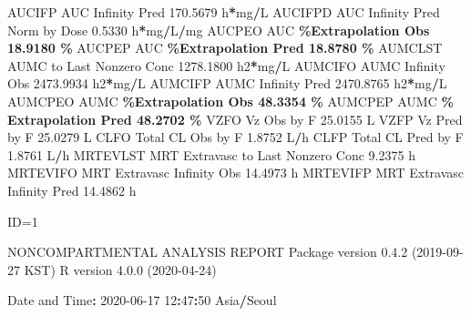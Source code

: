 \documentclass[
  12pt,
]{krantz}
\newenvironment{Shaded}{\begin{snugshade}}{\end{snugshade}}
\newcommand{\DecValTok}[1]{\textcolor[rgb]{0.00,0.00,0.81}{#1}}
\newcommand{\FloatTok}[1]{\textcolor[rgb]{0.00,0.00,0.81}{#1}}
\newcommand{\NormalTok}[1]{#1}
\newcommand{\OperatorTok}[1]{\textcolor[rgb]{0.81,0.36,0.00}{\textbf{#1}}}
\newcommand{\StringTok}[1]{\textcolor[rgb]{0.31,0.60,0.02}{#1}}
\begin{document}
\begin{Shaded}
\begin{Highlighting}[]
\NormalTok{AUCIFP     AUC Infinity Pred                             }\FloatTok{170.5679}\NormalTok{ h}\OperatorTok{*}\NormalTok{mg}\OperatorTok{/}\NormalTok{L}
\NormalTok{AUCIFPD    AUC Infinity Pred Norm by Dose                  }\FloatTok{0.5330}\NormalTok{ h}\OperatorTok{*}\NormalTok{mg}\OperatorTok{/}\NormalTok{L}\OperatorTok{/}\NormalTok{mg}
\NormalTok{AUCPEO     AUC }\OperatorTok{\%Extrapolation Obs                         18.9180 \%}
\NormalTok{AUCPEP     AUC }\OperatorTok{\%Extrapolation Pred                        18.8780 \%}
\NormalTok{AUMCLST    AUMC to Last Nonzero Conc                    }\FloatTok{1278.1800}\NormalTok{ h2}\OperatorTok{*}\NormalTok{mg}\OperatorTok{/}\NormalTok{L}
\NormalTok{AUMCIFO    AUMC Infinity Obs                            }\FloatTok{2473.9934}\NormalTok{ h2}\OperatorTok{*}\NormalTok{mg}\OperatorTok{/}\NormalTok{L}
\NormalTok{AUMCIFP    AUMC Infinity Pred                           }\FloatTok{2470.8765}\NormalTok{ h2}\OperatorTok{*}\NormalTok{mg}\OperatorTok{/}\NormalTok{L}
\NormalTok{AUMCPEO    AUMC }\OperatorTok{\%Extrapolation Obs                        48.3354 \%}
\NormalTok{AUMCPEP    AUMC }\OperatorTok{\% Extrapolation Pred                      48.2702 \%}
\NormalTok{VZFO       Vz Obs by F                                    }\FloatTok{25.0155}\NormalTok{ L}
\NormalTok{VZFP       Vz Pred by F                                   }\FloatTok{25.0279}\NormalTok{ L}
\NormalTok{CLFO       Total CL Obs by F                               }\FloatTok{1.8752}\NormalTok{ L}\OperatorTok{/}\NormalTok{h}
\NormalTok{CLFP       Total CL Pred by F                              }\FloatTok{1.8761}\NormalTok{ L}\OperatorTok{/}\NormalTok{h}
\NormalTok{MRTEVLST   MRT Extravasc to Last Nonzero Conc              }\FloatTok{9.2375}\NormalTok{ h}
\NormalTok{MRTEVIFO   MRT Extravasc Infinity Obs                     }\FloatTok{14.4973}\NormalTok{ h}
\NormalTok{MRTEVIFP   MRT Extravasc Infinity Pred                    }\FloatTok{14.4862}\NormalTok{ h}





\NormalTok{ID=}\DecValTok{1}

\NormalTok{                        NONCOMPARTMENTAL ANALYSIS REPORT}
\NormalTok{                       Package version }\DecValTok{0}\NormalTok{.}\FloatTok{4.2}\NormalTok{ (}\DecValTok{2019{-}09{-}27}\NormalTok{ KST)}
\NormalTok{                          R version }\DecValTok{4}\NormalTok{.}\FloatTok{0.0}\NormalTok{ (}\DecValTok{2020{-}04{-}24}\NormalTok{)}

\NormalTok{Date and Time}\OperatorTok{:}\StringTok{ }\DecValTok{2020{-}06{-}17} \DecValTok{12}\OperatorTok{:}\DecValTok{47}\OperatorTok{:}\DecValTok{50}\NormalTok{ Asia}\OperatorTok{/}\NormalTok{Seoul}


\end{Highlighting}
\end{Shaded}
\end{document}
